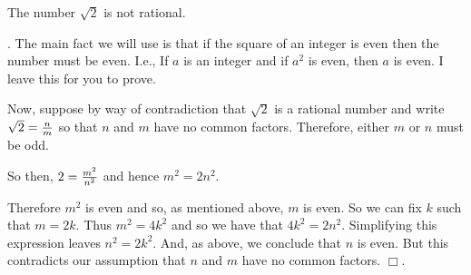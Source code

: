 \documentclass{amsart}
\begin{document}
\vskip 13pt
 The number $\sqrt{2}$ is not rational. 

\vskip 6pt
. The main fact we will use is that if the square of an integer is even then the number must be even. I.e., If $a$ is an integer and if $a^2$ is even, then $a$ is even. I leave this for you to prove. 

Now, suppose by way of contradiction that $\sqrt{2}$ is a rational number and write $\sqrt{2}={n\over m}$ so that $n$ and $m$ have no common factors. Therefore, either $m$ or $n$ must be odd. 

So then, $2={m^2\over n^2}$ and hence $m^2=2n^2$. 

Therefore $m^2$ is even and so, as mentioned above, $m$ is even. So we can fix $k$ such that $m=2k$. Thus $m^2=4k^2$ and so we have that
$4k^2=2n^2$. Simplifying this expression leaves $n^2=2k^2$. And, as above, we conclude that $n$ is even. But this contradicts our assumption that $n$ and $m$ have no common factors. 
\hfill$\Box$.
\end{document}
